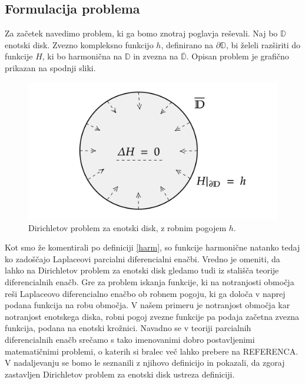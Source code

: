 \documentclass[mat1, tisk]{fmfdelo}
\begin{document}
\subsection{Formulacija problema}
    Za začetek navedimo problem, ki ga bomo znotraj poglavja reševali.
    Naj bo $\mathbb{D}$ enotski disk. Zvezno kompleksno funkcijo $h$, definirano na $\partial \mathbb{D}$, bi želeli razširiti do funkcije $H$, ki bo harmonična na $\mathbb{D}$ in zvezna na $\overline{\mathbb{D}}$.
    Opisan problem je grafično prikazan na spodnji sliki. 
    \begin{figure}[H]
        \begin{center}
            \includegraphics[width = \textwidth]{dirichlet_form.png}
            \caption{Dirichletov problem za enotski disk, z robnim pogojem $h$.}
        \end{center}    
    \end{figure}

    Kot smo že komentirali po definiciji \ref{harm}, so funkcije harmonične natanko tedaj ko zadoščajo Laplaceovi parcialni diferencialni enačbi.   
    Vredno je omeniti, da lahko na Dirichletov problem za enotski disk gledamo tudi iz stališča teorije diferencialnih enačb. Gre za problem iskanja funkcije, ki na notranjosti območja reši Laplaceovo diferencialno enačbo ob robnem pogoju, ki ga določa v naprej podana funkcija na robu območja.     
    V našem primeru je notranjost območja kar notranjost enotskega diska, robni pogoj zvezne funkcije pa podaja začetna zvezna funkcija, podana na enotski krožnici.
    Navadno se v teoriji parcialnih diferencialnih enačb srečamo s tako imenovanimi dobro postavljenimi matematičnimi problemi, o katerih si bralec več lahko prebere na REFERENCA.     
    V nadaljevanju se bomo le seznanili z njihovo definicijo in pokazali, da zgoraj zastavljen Dirichletov problem za enotski disk ustreza definiciji. 
\end{document}
